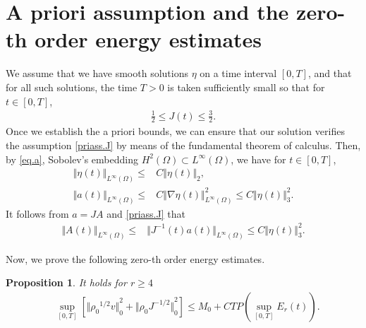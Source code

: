 \documentclass[12pt,twoside,reqno]{amsart}
\numberwithin{equation}{section}
\newtheorem{proposition}[theorem]{Proposition}
\theoremstyle{definition}
\theoremstyle{remark}
\begin{document}
\section{A priori assumption and the zero-th order energy estimates}\label{sec.5}

We assume that we have smooth solutions $\eta$ on a time interval $[0,T]$, and that for all such solutions, the time $T>0$ is taken sufficiently small so that for $t\in[0,T]$,
\begin{align}\label{priass.J}
  \frac{1}{2}{\leqslant} J(t){\leqslant} \frac{3}{2}.
\end{align}
Once we establish the a priori bounds, we can ensure that our solution verifies  the assumption \eqref{priass.J} by means of the fundamental theorem of calculus. Then, by \eqref{eq.a}, Sobolev's embedding $H^2(\Omega)\subset L^\infty(\Omega)$, we have for $t\in[0,T]$,
\begin{align}
  {\Vert{\eta(t)}\Vert}_{L^\infty(\Omega)}{\leqslant}& C{\Vert{\eta(t)}\Vert}_2,\\
  {\Vert{a(t)}\Vert}_{L^\infty(\Omega)}{\leqslant}& C{\Vert{{\nabla}\eta(t)}\Vert}_{L^\infty(\Omega)}^2{\leqslant} C{\Vert{\eta(t)}\Vert}_{3}^2.
\end{align}
It follows from $a=JA$ and \eqref{priass.J} that
\begin{align}\label{eq.Ainfty}
  {\Vert{A(t)}\Vert}_{L^\infty(\Omega)}{\leqslant}& {\Vert{J^{-1}(t)a(t)}\Vert}_{L^\infty(\Omega)}
  {\leqslant} C{\Vert{\eta(t)}\Vert}_{3}^2.
\end{align}

Now, we prove the following zero-th order energy estimates.
\begin{proposition}
  It holds for $r{\geqslant} 4$
  \begin{align*}
  &\sup_{[0,T]}\left[{\Vert{{\rho_0}^{1/2}v}\Vert}_0^2+ {\Vert{{\rho_0}  J^{-1/2}}\Vert}_0^2\right]
  {\leqslant} M_0+CTP(\sup_{[0,T]}E_r(t)).
\end{align*}
\end{proposition}
\end{document}
